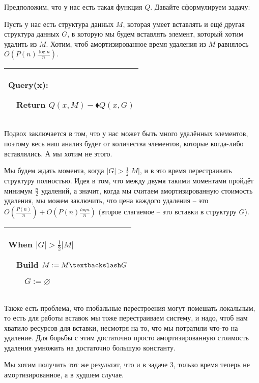 Предположим, что у нас есть такая функция $Q$. Давайте сформулируем задачу:

\begin{task}
Пусть у нас есть структура данных $M$, которая умеет вставлять и ещё другая структура данных $G$, в которую мы будем вставлять элемент, который хотим удалить из $M$. Хотим, чтоб амортизированное время удаления из $M$ равнялось $O\left(P(n)\frac{\log n}{n}\right)$.

\end{task}

\begin{tabular}{|p{5cm}|}
\hline
Query(x):

$\quad$Return $Q(x,M)-\blacklozenge Q(x,G)$\\
\hline
\end{tabular}


Подвох заключается в том, что у нас может быть много удалённых элементов, поэтому весь наш анализ будет от количества элементов, которые когда-либо вставлялись. А мы хотим не этого.

Мы будем ждать момента, когда $|G|>\frac{1}{2}|M|$, и в это время перестраивать структуру полностью. Идея в том, что между двумя такими моментами пройдёт минимум $\frac{n}{2}$ удалений, а значит, когда мы считаем амортизированную стоимость удаления, мы можем заключить, что цена каждого удаления -- это
$O\left(\frac{P(n)}{n}\right)+O\left(P(n)\frac{log n}{n}\right)$ (второе слагаемое -- это вставки в структуру $G$).

\begin{tabular}{|p{5cm}|}
\hline

When $|G|>\frac{1}{2}|M|$

$\quad$Build $M:=M\textbackslash G$

$\quad$$\quad$$G:=\varnothing$\\

\hline
\end{tabular}

Также есть проблема, что глобальные перестроения могут помешать локальным, то есть для работы вставок мы тоже перестраиваем систему, и надо, чтоб нам хватило ресурсов для вставки, несмотря на то, что мы потратили что-то на удаление. Для борьбы с этим достаточно просто амортизированную стоимость удаления умножить на достаточно большую константу.


\begin{task}
Мы хотим получить тот же результат, что и в задаче 3, только время теперь не амортизированное, а в худшем случае.
\end{task}

